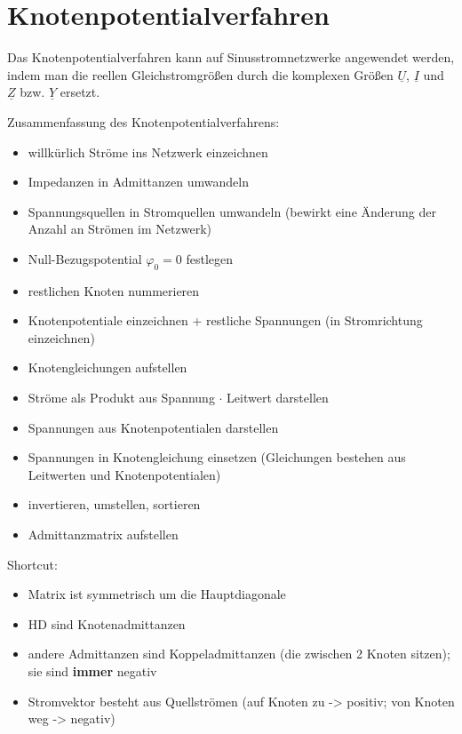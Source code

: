 \documentclass[
  ngerman,
  letterpaper,
]{scrbook}
\providecommand{\tightlist}{%
  \setlength{\itemsep}{0pt}\setlength{\parskip}{0pt}}
\begin{document}
\section{Knotenpotentialverfahren}\label{knotenpotentialverfahren}

Das Knotenpotentialverfahren kann auf Sinusstromnetzwerke angewendet
werden, indem man die reellen Gleichstromgrößen durch die komplexen
Größen \(\underline{U}\), \(\underline{I}\) und \(\underline{Z}\) bzw.
\(\underline{Y}\) ersetzt.

Zusammenfassung des Knotenpotentialverfahrens:

\begin{itemize}
\tightlist
\item
  willkürlich Ströme ins Netzwerk einzeichnen
\item
  Impedanzen in Admittanzen umwandeln
\item
  Spannungsquellen in Stromquellen umwandeln (bewirkt eine Änderung der
  Anzahl an Strömen im Netzwerk)
\item
  Null-Bezugspotential \(\varphi_0 = 0\) festlegen
\item
  restlichen Knoten nummerieren
\item
  Knotenpotentiale einzeichnen + restliche Spannungen (in Stromrichtung
  einzeichnen)
\item
  Knotengleichungen aufstellen
\item
  Ströme als Produkt aus Spannung \(\cdot\) Leitwert darstellen
\item
  Spannungen aus Knotenpotentialen darstellen
\item
  Spannungen in Knotengleichung einsetzen (Gleichungen bestehen aus
  Leitwerten und Knotenpotentialen)
\item
  invertieren, umstellen, sortieren
\item
  Admittanzmatrix aufstellen
\end{itemize}

Shortcut:

\begin{itemize}
\tightlist
\item
  Matrix ist symmetrisch um die Hauptdiagonale
\item
  HD sind Knotenadmittanzen
\item
  andere Admittanzen sind Koppeladmittanzen (die zwischen 2 Knoten
  sitzen); sie sind \textbf{immer} negativ
\item
  Stromvektor besteht aus Quellströmen (auf Knoten zu -\textgreater{}
  positiv; von Knoten weg -\textgreater{} negativ)
\end{itemize}
\end{document}
